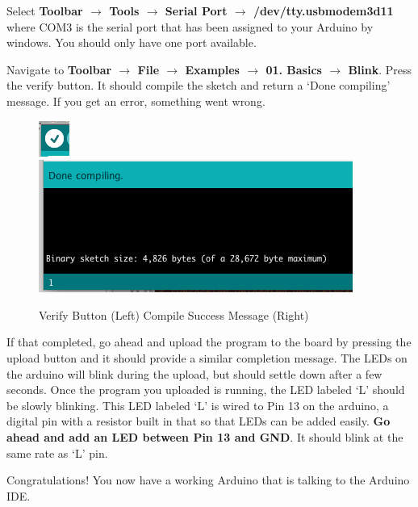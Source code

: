 \documentclass[11pt,a4paper]{article}
\begin{document}
\begin{enumerate}
\begin{enumerate}
        
        Select \textbf{Toolbar $\rightarrow$ Tools $\rightarrow$ Serial Port $\rightarrow$ /dev/tty.usbmodem3d11} where COM3 is the serial port that has been assigned to your Arduino by windows.  You should only have one port available.
    \end{enumerate}

    Navigate to \textbf{Toolbar $\rightarrow$ File $\rightarrow$ Examples $\rightarrow$ 01. Basics $\rightarrow$ Blink}.  Press the verify button.  It should compile the sketch and return a `Done compiling' message.  If you get an error, something went wrong.
    \begin{figure}[htbp]
        \centering
            \includegraphics{figures/verify.png}\includegraphics{figures/compile.png}
        \caption{Verify Button (Left) Compile Success Message (Right)}
        \label{fig:figures_verify}
    \end{figure}
    If that completed, go ahead and upload the program to the board by pressing the upload button and it should provide a similar completion message.  The LEDs on the arduino will blink during the upload, but should settle down after a few seconds.  Once the program you uploaded is running, the LED labeled `L' should be slowly blinking.  This LED labeled `L' is wired to Pin 13 on the arduino, a digital pin with a resistor built in that so that LEDs can be added easily.  \textbf{Go ahead and add an LED between Pin 13 and GND}.  It should blink at the same rate as `L' pin.
\end{enumerate}

Congratulations!  You now have a working Arduino that is talking to the Arduino IDE.




\end{document}
